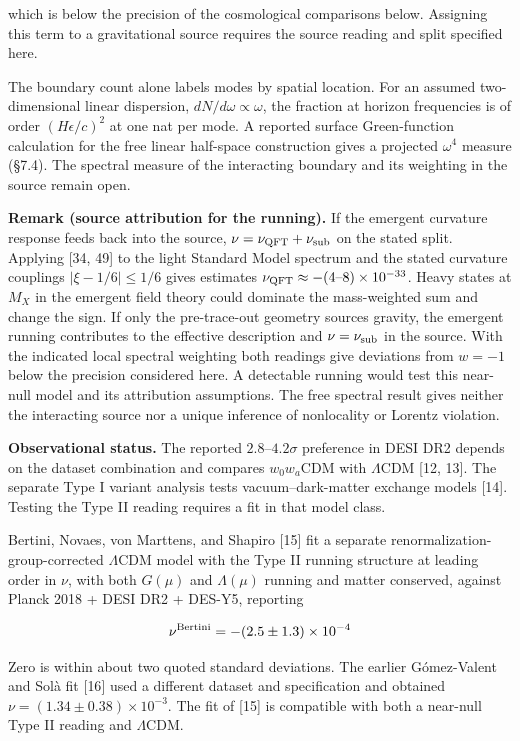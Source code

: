 \documentclass[
]{article}
\begin{document}
which is below the precision of the cosmological comparisons below.
Assigning this term to a gravitational source requires the source
reading and split specified here.

The boundary count alone labels modes by spatial location. For an
assumed two-dimensional linear dispersion, \(dN/d\omega\propto\omega\),
the fraction at horizon frequencies is of order \((H\epsilon/c)^2\) at
one nat per mode. A reported surface Green-function calculation for the
free linear half-space construction gives a projected \(\omega^4\)
measure (§7.4). The spectral measure of the interacting boundary and its
weighting in the source remain open.

\textbf{Remark (source attribution for the running).} If the emergent
curvature response feeds back into the source,
\(\nu=\nu_{\rm QFT}+\nu_{\rm sub}\) on the stated split. Applying {[}34,
49{]} to the light Standard Model spectrum and the stated curvature
couplings \(|\xi-1/6|\leq1/6\) gives estimates
\(\nu_{\rm QFT}\approx-(4\text{–}8)\times10^{-33}\). Heavy states at
\(M_X\) in the emergent field theory could dominate the mass-weighted
sum and change the sign. If only the pre-trace-out geometry sources
gravity, the emergent running contributes to the effective description
and \(\nu=\nu_{\rm sub}\) in the source. With the indicated local
spectral weighting both readings give deviations from \(w=-1\) below the
precision considered here. A detectable running would test this
near-null model and its attribution assumptions. The free spectral
result gives neither the interacting source nor a unique inference of
nonlocality or Lorentz violation.

\textbf{Observational status.} The reported \(2.8\)--\(4.2\sigma\)
preference in DESI DR2 depends on the dataset combination and compares
\(w_0w_a\)CDM with \(\Lambda\)CDM {[}12, 13{]}. The separate Type I
variant analysis tests vacuum--dark-matter exchange models {[}14{]}.
Testing the Type II reading requires a fit in that model class.

Bertini, Novaes, von Marttens, and Shapiro {[}15{]} fit a separate
renormalization-group-corrected \(\Lambda\)CDM model with the Type II
running structure at leading order in \(\nu\), with both \(G(\mu)\) and
\(\Lambda(\mu)\) running and matter conserved, against Planck 2018 +
DESI DR2 + DES-Y5, reporting

\[\nu^{\rm Bertini} = -(2.5 \pm 1.3) \times 10^{-4}\]

Zero is within about two quoted standard deviations. The earlier
Gómez-Valent and Solà fit {[}16{]} used a different dataset and
specification and obtained \(\nu=(1.34\pm0.38)\times10^{-3}\). The fit
of {[}15{]} is compatible with both a near-null Type II reading and
\(\Lambda\)CDM.
\end{document}
